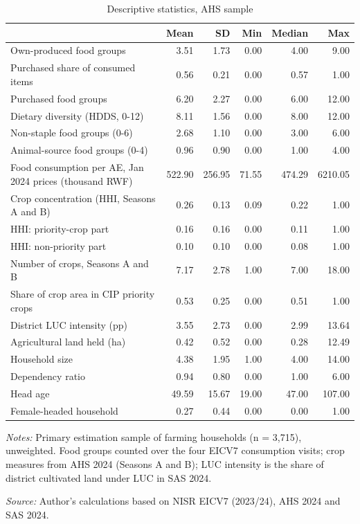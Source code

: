 \begin{table}[htbp]
\centering
\caption{Descriptive statistics, AHS sample}
\label{tab:table1_descriptives}
\footnotesize
\setlength{\tabcolsep}{4pt}
\centering
\begin{tabular}[t]{lrrrrr}
\toprule
   & Mean & SD & Min & Median & Max\\
\midrule
Own-produced food groups & 3.51 & 1.73 & 0.00 & 4.00 & 9.00\\
Purchased share of consumed items & 0.56 & 0.21 & 0.00 & 0.57 & 1.00\\
Purchased food groups & 6.20 & 2.27 & 0.00 & 6.00 & 12.00\\
Dietary diversity (HDDS, 0-12) & 8.11 & 1.56 & 0.00 & 8.00 & 12.00\\
Non-staple food groups (0-6) & 2.68 & 1.10 & 0.00 & 3.00 & 6.00\\
Animal-source food groups (0-4) & 0.96 & 0.90 & 0.00 & 1.00 & 4.00\\
Food consumption per AE, Jan 2024 prices (thousand RWF) & 522.90 & 256.95 & 71.55 & 474.29 & 6210.05\\
Crop concentration (HHI, Seasons A and B) & 0.26 & 0.13 & 0.09 & 0.22 & 1.00\\
HHI: priority-crop part & 0.16 & 0.16 & 0.00 & 0.11 & 1.00\\
HHI: non-priority part & 0.10 & 0.10 & 0.00 & 0.08 & 1.00\\
Number of crops, Seasons A and B & 7.17 & 2.78 & 1.00 & 7.00 & 18.00\\
Share of crop area in CIP priority crops & 0.53 & 0.25 & 0.00 & 0.51 & 1.00\\
District LUC intensity (pp) & 3.55 & 2.73 & 0.00 & 2.99 & 13.64\\
Agricultural land held (ha) & 0.42 & 0.52 & 0.00 & 0.28 & 12.49\\
Household size & 4.38 & 1.95 & 1.00 & 4.00 & 14.00\\
Dependency ratio & 0.94 & 0.80 & 0.00 & 1.00 & 6.00\\
Head age & 49.59 & 15.67 & 19.00 & 47.00 & 107.00\\
Female-headed household & 0.27 & 0.44 & 0.00 & 0.00 & 1.00\\
\bottomrule
\end{tabular}

\vspace{0.5em}
\begin{minipage}{\linewidth}
\footnotesize
\textit{Notes:} Primary estimation sample of farming households (n = 3,715), unweighted. Food groups counted over the four EICV7 consumption visits; crop measures from AHS 2024 (Seasons A and B); LUC intensity is the share of district cultivated land under LUC in SAS 2024.

\textit{Source:} Author's calculations based on NISR EICV7 (2023/24), AHS 2024 and SAS 2024.
\end{minipage}
\end{table}
